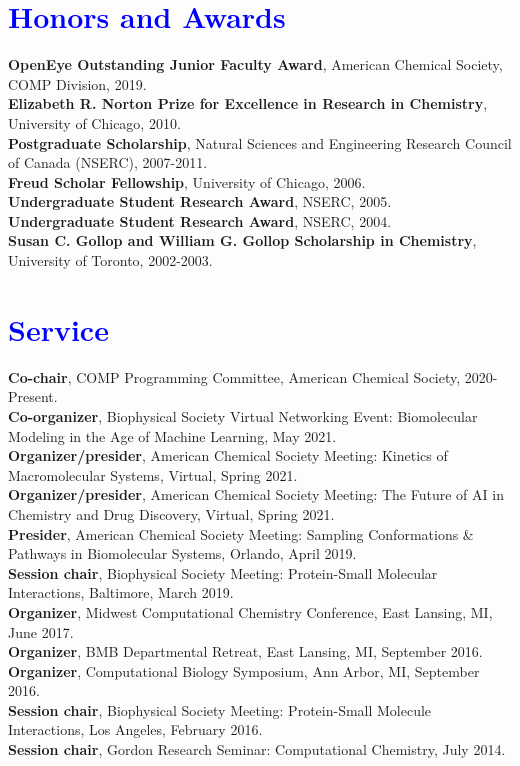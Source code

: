 \documentclass[margin,line]{res}
\begin{document}
\begin{resume}


\section{\sc \textcolor{blue}{ Honors and Awards} }
{\bf OpenEye Outstanding Junior Faculty Award}, American Chemical Society, COMP Division, 2019. \\
{\bf Elizabeth R. Norton Prize for Excellence in Research in Chemistry}, University of Chicago, 2010. \\
{\bf Postgraduate Scholarship}, Natural Sciences and Engineering Research Council of Canada (NSERC), 2007-2011.\\
{\bf Freud Scholar Fellowship}, University of Chicago, 2006. \\
{\bf Undergraduate Student Research Award}, NSERC, 2005. \\
{\bf Undergraduate Student Research Award}, NSERC, 2004. \\
{\bf Susan C. Gollop and William G. Gollop Scholarship in Chemistry}, University of Toronto, 2002-2003. \\

\section{\sc \textcolor{blue}{Service}}
{\bf Co-chair}, COMP Programming Committee, American Chemical Society, 2020-Present.\\
{\bf Co-organizer}, Biophysical Society Virtual Networking Event: Biomolecular Modeling in the Age of Machine Learning, May 2021.\\
{\bf Organizer/presider}, American Chemical Society Meeting: Kinetics of Macromolecular Systems, Virtual, Spring 2021.\\
{\bf Organizer/presider}, American Chemical Society Meeting: The Future of AI in Chemistry and Drug Discovery, Virtual, Spring 2021.\\
{\bf Presider}, American Chemical Society Meeting: Sampling Conformations \& Pathways in Biomolecular Systems, Orlando, April 2019.\\
{\bf Session chair}, Biophysical Society Meeting: Protein-Small Molecular Interactions, Baltimore, March 2019.\\
{\bf Organizer}, Midwest Computational Chemistry Conference, East Lansing, MI, June 2017. \\
{\bf Organizer}, BMB Departmental Retreat, East Lansing, MI, September 2016. \\
{\bf Organizer}, Computational Biology Symposium, Ann Arbor, MI, September 2016. \\
{\bf Session chair}, Biophysical Society Meeting: Protein-Small Molecule Interactions, Los Angeles, February 2016. \\
{\bf Session chair}, Gordon Research Seminar: Computational Chemistry, July 2014. \\


\end{resume}
\end{document}

